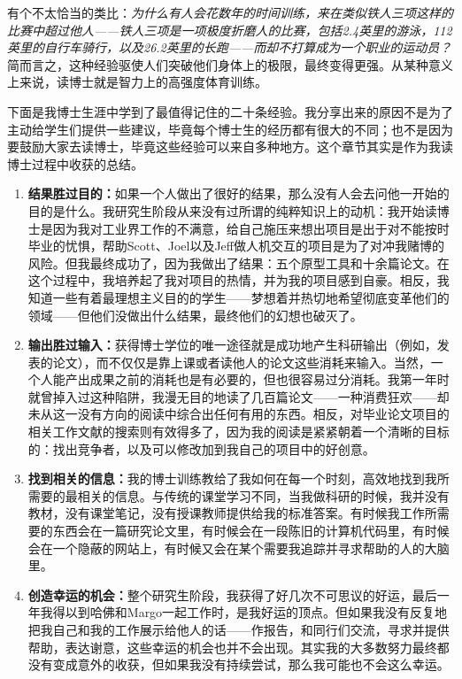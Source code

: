 \documentclass[letter,12pt]{book}
\begin{document}
\begin{CJK}{UTF8}{gbsn}
有个不太恰当的类比：\emph{为什么有人会花数年的时间训练，来在类似铁人三项这样的比赛中超过他人——铁人三项是一项极度折磨人的比赛，包括2.4英里的游泳，112英里的自行车骑行，以及26.2英里的长跑——而却不打算成为一个职业的运动员？}简而言之，这种经验驱使人们突破他们身体上的极限，最终变得更强。从某种意义上来说，读博士就是智力上的高强度体育训练。

\breakline

下面是我博士生涯中学到了最值得记住的二十条经验。我分享出来的原因不是为了主动给学生们提供一些建议，毕竟每个博士生的经历都有很大的不同；也不是因为要鼓励大家去读博士，毕竟这些经验可以来自多种地方。这个章节其实是作为我读博士过程中收获的总结。
\begin{enumerate}
  \item \textbf{结果胜过目的：}如果一个人做出了很好的结果，那么没有人会去问他一开始的目的是什么。我研究生阶段从来没有过所谓的纯粹知识上的动机：我开始读博士是因为我对工业界工作的不满意，给自己施压来想出项目是出于对不能按时毕业的忧惧，帮助Scott、Joel以及Jeff做人机交互的项目是为了对冲我赌博的风险。但我最终成功了，因为我做出了结果：五个原型工具和十余篇论文。在这个过程中，我培养起了我对项目的热情，并为我的项目感到自豪。相反，我知道一些有着最理想主义目的的学生——梦想着并热切地希望彻底变革他们的领域——但他们没做出什么结果，最终他们的幻想也破灭了。
  \item \textbf{输出胜过输入：}获得博士学位的唯一途径就是成功地产生科研输出（例如，发表的论文），而不仅仅是靠上课或者读他人的论文这些消耗来输入。当然，一个人能产出成果之前的消耗也是有必要的，但也很容易过分消耗。我第一年时就曾掉入过这种陷阱，我漫无目的地读了几百篇论文——一种消费狂欢——却未从这一没有方向的阅读中综合出任何有用的东西。相反，对毕业论文项目的相关工作文献的搜索则有效得多了，因为我的阅读是紧紧朝着一个清晰的目标的：找出竞争者，以及可以修改加到我自己的项目中的好创意。
  \item \textbf{找到相关的信息：}我的博士训练教给了我如何在每一个时刻，高效地找到我所需要的最相关的信息。与传统的课堂学习不同，当我做科研的时候，我并没有教材，没有课堂笔记，没有授课教师提供给我的标准答案。有时候我工作所需要的东西会在一篇研究论文里，有时候会在一段陈旧的计算机代码里，有时候会在一个隐蔽的网站上，有时候又会在某个需要我追踪并寻求帮助的人的大脑里。
  \item \textbf{创造幸运的机会：}整个研究生阶段，我获得了好几次不可思议的好运，最后一年我得以到哈佛和Margo一起工作时，是我好运的顶点。但如果我没有反复地把我自己和我的工作展示给他人的话——作报告，和同行们交流，寻求并提供帮助，表达谢意，这些幸运的机会也并不会出现。其实我的大多数努力最终都没有变成意外的收获，但如果我没有持续尝试，那么我可能也不会这么幸运。

\end{enumerate}
\end{CJK}
\end{document}

